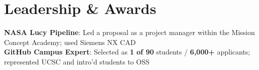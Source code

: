 \documentclass[letterpaper,11pt]{article}
\newcommand{\resumeSubHeadingListEnd}{\end{itemize}}
\begin{document}

\section{Leadership \& Awards}
\begin{itemize}[leftmargin=0.15in, label={}]
  \small{\item{
        \textbf{NASA Lucy Pipeline}{: Led a proposal as a project manager within the Mission Concept Academy; used Siemens NX CAD} \\
        \textbf{GitHub Campus Expert}{: Selected as \textbf{1 of 90} students / \textbf{6,000+} applicants; represented UCSC and intro'd students to OSS} \\
        }}
\end{itemize}
\vspace{-4pt}
\end{document}
